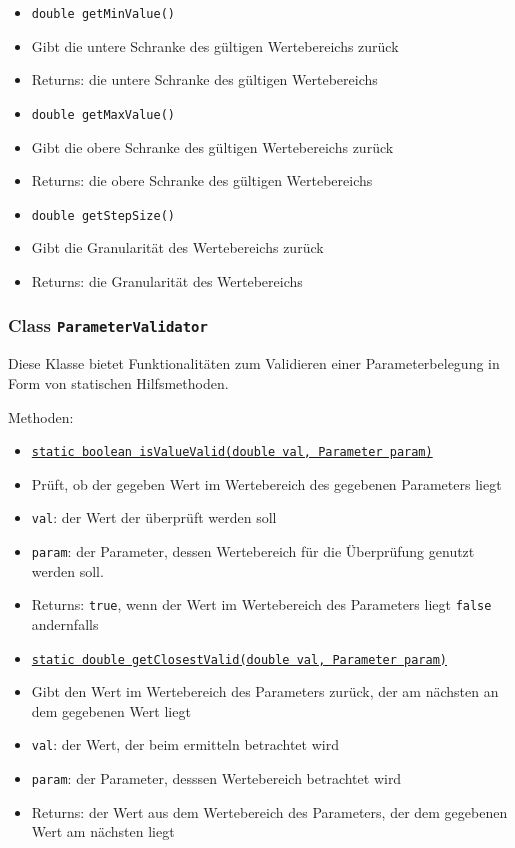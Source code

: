 \documentclass[parskip=full,11pt]{scrartcl}
\begin{document}
\begin{itemize}\itemsep -10pt
	\item \texttt{double getMinValue()}
	\item[] Gibt die untere Schranke des gültigen Wertebereichs zurück
	\item[] Returns: die untere Schranke des gültigen Wertebereichs
	\item \texttt{double getMaxValue()}
	\item[] Gibt die obere Schranke des gültigen Wertebereichs zurück
	\item[]Returns: die obere Schranke des gültigen Wertebereichs
	\item \texttt{double getStepSize()}
	\item[] Gibt die Granularität des Wertebereichs zurück
	\item[]Returns: die Granularität des Wertebereichs
\end{itemize}

\subsubsection{Class \texttt{ParameterValidator}}

Diese Klasse bietet Funktionalitäten zum Validieren einer Parameterbelegung in Form von statischen Hilfsmethoden.

Methoden:

\begin{itemize} \itemsep -10pt
	\item \underline{\texttt{static boolean isValueValid(double val, Parameter param)}}
	\item[] Prüft, ob der gegeben Wert im Wertebereich des gegebenen Parameters liegt
	\item[] \texttt{val}: der Wert der überprüft werden soll
	\item[] \texttt{param}: der Parameter, dessen Wertebereich für die Überprüfung genutzt werden soll.
	\item[] Returns: \texttt{true}, wenn der Wert im Wertebereich des Parameters liegt \texttt{false} andernfalls
	\item \underline{\texttt{static double getClosestValid(double val, Parameter param)}}
	\item[] Gibt den Wert im Wertebereich des Parameters zurück, der am nächsten an dem gegebenen Wert liegt
	\item[] \texttt{val}: der Wert, der beim ermitteln betrachtet wird
	\item[] \texttt{param}: der Parameter, desssen Wertebereich betrachtet wird
	\item[] Returns: der Wert aus dem Wertebereich des Parameters, der dem gegebenen Wert am nächsten liegt
\end{itemize}
\end{document}

